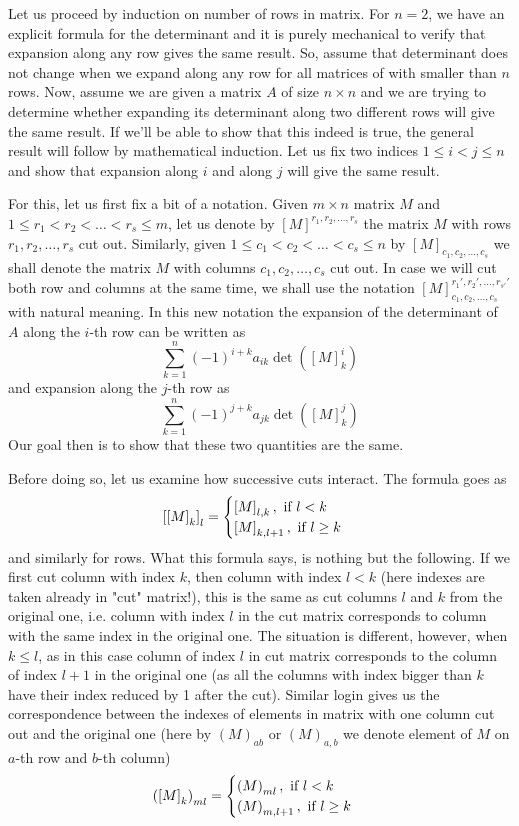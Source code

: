 \documentclass[8pt]{article} %
\begin{document}
Let us proceed by induction on number of rows in matrix.
For $n=2$, we have an explicit formula for the determinant and it is purely mechanical to verify that expansion
along any row gives the same result. So, assume that determinant does not change when we expand along any row for all matrices of with smaller
than $n$ rows. Now,
assume we are given a matrix $A$ of size $n\times n$ and we are trying to determine whether expanding its determinant along two different
rows will give the same result. If we'll be able to show that this indeed is true, the general result will follow by mathematical induction. Let
us fix two indices $1\leq i<j\leq n$ and show that expansion along $i$ and along $j$ will give the same result.

For this, let us first fix a bit of a notation. Given $m\times n$ matrix $M$ and
$1\leq r_1<r_2<\hdots<r_s\leq m$, let us denote by $[M]^{r_1,r_2,\hdots,r_s}$
the matrix $M$ with rows $r_1, r_2,\hdots,r_s$ cut out.
Similarly, given $1\leq c_1<c_2<\hdots<c_s\leq n$
by $[M]_{c_1,c_2,\hdots,c_s}$ we shall denote the matrix $M$ with columns $c_1,c_2,\hdots,c_s$ cut out. In case we will cut both row and columns
at the same time, we shall use the notation $[M]_{c_1,c_2,\hdots,c_s}^{r_1',r_2',\hdots,r_{s'}'}$ with natural meaning. In this new notation the 
expansion of the determinant of $A$ along the $i$-th row can be written as
\[\sum_{k=1}^n(-1)^{i+k}a_{ik}\det([M]_k^i)\]
and expansion along the $j$-th row as
\[\sum_{k=1}^n(-1)^{j+k}a_{jk}\det([M]_k^j)\]
Our goal then is to show that these two quantities are the same.

Before doing so, let us examine how successive cuts interact. The formula goes as
\[\left[\left[M\right]_k\right]_l=\begin{cases}\left[M\right]_{l,k},\mbox{ if }l<k\\\left[M\right]_{k,l+1},\mbox{ if }l\geq k\end{cases}\]
	and similarly for rows. What this formula says, is nothing but the following. If we first cut column with index
	$k$, then column with index $l<k$ (here indexes are taken already in "cut" matrix!), this is the same as cut columns $l$ and $k$ from the 
	original one, i.e. column with index $l$ in the cut matrix corresponds to column with the same index in the original one. The situation is
	different, however, when $k\leq l$, as in this case column of index $l$ in cut matrix corresponds to the column of index
	$l+1$ in the original
	one (as all the columns with index bigger than $k$ have their index reduced by 1 after the cut). Similar login gives us the correspondence
	between the indexes of elements in matrix with one
	column cut out and the original one (here by $(M)_{ab}$ or $(M)_{a,b}$ we denote element of $M$ on $a$-th row and $b$-th 
	column)
	\[\left(\left[M\right]_k\right)_{ml}=\begin{cases}
		\left(M\right)_{ml},\mbox{ if }l<k\\
		\left(M\right)_{m,l+1},\mbox{ if }l\geq k
	\end{cases}\]
\end{document}
